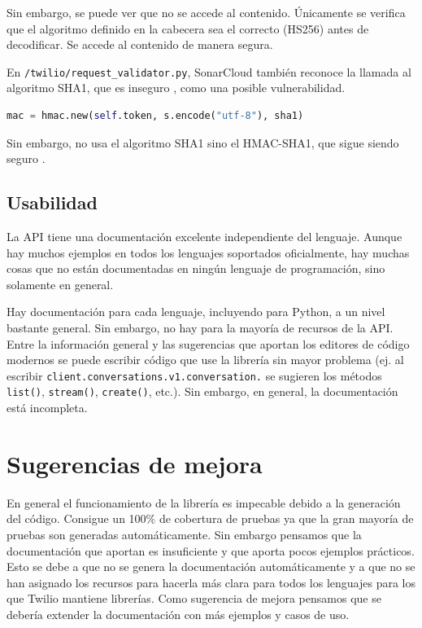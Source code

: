 \documentclass{article}
\begin{document}
Sin embargo, se puede ver que no se accede al contenido.
Únicamente se verifica que el algoritmo definido en la cabecera
sea el correcto (HS256) antes de decodificar.
Se accede al contenido de manera segura.

\hfill

En \verb|/twilio/request_validator.py|,
SonarCloud también reconoce la llamada al algoritmo SHA1,
que es inseguro \cite{sha1-broken},
como una posible vulnerabilidad.

\begin{lstlisting}[language=Python]
mac = hmac.new(self.token, s.encode("utf-8"), sha1)
\end{lstlisting}

Sin embargo, no usa el algoritmo SHA1
sino el HMAC-SHA1, que sigue siendo seguro \cite{hmac-sha1}.

\newpage

\subsection{Usabilidad}

La API tiene una documentación excelente independiente del lenguaje.
Aunque hay muchos ejemplos en todos los lenguajes soportados oficialmente,
hay muchas cosas que no están documentadas 
en ningún lenguaje de programación,
sino solamente en general.

Hay documentación para cada lenguaje,
incluyendo para Python,
a un nivel bastante general.
Sin embargo, no hay para la mayoría de recursos de la API.
Entre la información general
y las sugerencias que aportan los editores de código modernos
se puede escribir código que use la librería sin mayor problema
(ej. al escribir \verb|client.conversations.v1.conversation.|
se sugieren los métodos
\verb|list()|, \verb|stream()|, \verb|create()|, etc.).
Sin embargo, en general, la documentación está incompleta.


\section{Sugerencias de mejora}

En general el funcionamiento de la librería es impecable
debido a la generación del código.
Consigue un 100\% de cobertura de pruebas
ya que la gran mayoría de pruebas son generadas automáticamente.
Sin embargo pensamos que la documentación que aportan es insuficiente
y que aporta pocos ejemplos prácticos.
Esto se debe a que no se genera la documentación automáticamente
y a que no se han asignado los recursos para hacerla más clara
para todos los lenguajes para los que Twilio mantiene librerías.
Como sugerencia de mejora
pensamos que se debería extender la documentación
con más ejemplos y casos de uso.
\end{document}
